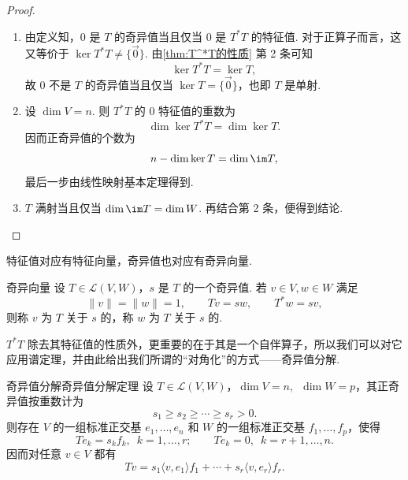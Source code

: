\begin{proof}
    \begin{enumerate}
        \item 由定义知，$0$ 是 $T$ 的奇异值当且仅当 $0$ 是 $T^*T$ 的特征值. 对于正算子而言，这又等价于 $\ker T^*T \neq \{\vec{0}\}$. 由\autoref{thm:T^*T的性质} 第 2 条可知
              \[
                  \ker T^*T = \ker T,
              \]
              故 $0$ 不是 $T$ 的奇异值当且仅当 $\ker T = \{\vec{0}\}$，也即 $T$ 是单射.

        \item 设 $\dim V = n$. 则 $T^*T$ 的 $0$ 特征值的重数为
              \[
                  \dim \ker T^*T = \dim \ker T.
              \]
              因而正奇异值的个数为
              \[
                  n - \dim \ker T = \dim \im T,
              \]
              最后一步由线性映射基本定理得到.

        \item $T$ 满射当且仅当 $\dim \im T = \dim W$. 再结合第 2 条，便得到结论.
    \end{enumerate}
\end{proof}

特征值对应有特征向量，奇异值也对应有奇异向量.

\begin{definition}{奇异向量}{} 
    设 $T \in \mathcal{L}(V, W)$，$s$ 是 $T$ 的一个奇异值. 若 $v \in V, w \in W$ 满足
    \[
        \lVert v \rVert = \lVert w \rVert = 1,\qquad Tv = sw,\qquad T^*w = sv,
    \]
    则称 $v$ 为 $T$ 关于 $s$ 的，称 $w$ 为 $T$ 关于 $s$ 的.
\end{definition}

$T^*T$ 除去其特征值的性质外，更重要的在于其是一个自伴算子，所以我们可以对它应用谱定理，并由此给出我们所谓的“对角化”的方式——奇异值分解.

\begin{theorem}{奇异值分解}{奇异值分解定理} 
    设 $T \in \mathcal{L}(V, W)$，$\dim V = n,\enspace \dim W = p$，其正奇异值按重数计为
    \[
        s_1 \geqslant s_2 \geqslant \cdots \geqslant s_r > 0.
    \]
    则存在 $V$ 的一组标准正交基 $e_1, \ldots, e_n$ 和 $W$ 的一组标准正交基 $f_1, \ldots, f_p$，使得
    \[
        Te_k = s_k f_k,\enspace k = 1, \ldots, r;\qquad Te_k = 0,\enspace k = r+1, \ldots, n.
    \]
    因而对任意 $v \in V$ 都有
    \[
        Tv = s_1 \langle v, e_1 \rangle f_1 + \cdots + s_r \langle v, e_r \rangle f_r.
    \]
\end{theorem}

